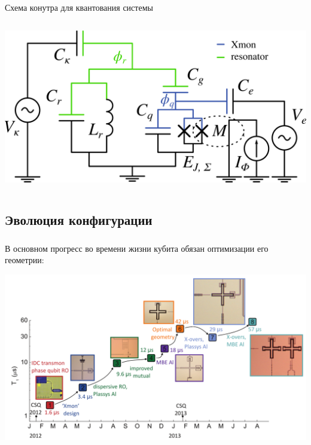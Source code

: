 \documentclass[aspectratio=169, 13pt, t]{beamer}
\begin{document}
\begin{frame}[t]\frametitle{\secname}\framesubtitle{\subsecname}
Схема конутра для квантования системы

\vspace{.5cm}
\begin{columns}[c]
\column{\textwidth}
\centering
\includegraphics[height=0.6\textheight]{xmon-resonator}
\end{columns}

\end{frame}

\subsection{Эволюция конфигурации}
\begin{frame}[t]\frametitle{\secname}\framesubtitle{\subsecname}

В основном прогресс во времени жизни кубита обязан оптимизации его геометрии:

\centering
\includegraphics[height=0.75\textheight]{perspective}

\end{frame}
\end{document}
